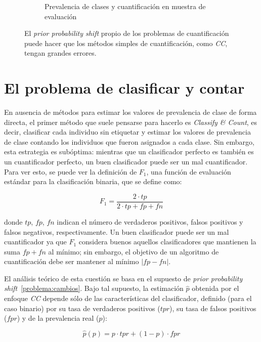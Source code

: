 \begin{figure}[h]
\begin{subfigure}[t]{0.4\textwidth}
        \caption{Prevalencia de clases y cuantificación en muestra de
        evaluación}\label{cambios:cuantificacion_tst}
    \end{subfigure}
    \caption{El {\it prior probability shift\/} propio de los problemas de
    cuantificación puede hacer que los métodos simples de cuantificación, como
    {\it CC}, tengan grandes errores.}
\end{figure}

\section{El problema de clasificar y contar}\label{problema:clasificar_y_contar}

En ausencia de métodos para estimar los valores de prevalencia de clase de forma
directa, el primer método que suele pensarse para hacerlo es {\it Classify \&
Count}, es decir, clasificar cada individuo sin etiquetar y estimar los valores
de prevalencia de clase contando los individuos que fueron asignados a cada
clase. Sin embargo, esta estrategia es subóptima: mientras que un clasificador
perfecto es también es un cuantificador perfecto, un buen clasificador puede ser
un mal cuantificador. Para ver esto, se puede ver la definición de $F_1$, una
función de evaluación estándar para la clasificación binaria, que se define
como:

\begin{equation}
    F_1 = \frac{2 \cdot tp}{2 \cdot tp + fp + fn}
\end{equation}

donde $tp$, $fp$, $fn$ indican el número de verdaderos positivos, falsos
positivos y falsos negativos, respectivamente. Un buen clasificador puede ser un
mal cuantificador ya que $F_1$ considera buenos aquellos clasificadores que
mantienen la suma $fp + fn$ al mínimo; sin embargo, el objetivo de un algoritmo
de cuantificación debe ser mantener al mínimo $|fp-fn|$.

El análisis teórico de esta cuestión se basa en el supuesto de {\it prior
probability shift\/}~\ref{problema:cambios}. Bajo tal supuesto, la estimación
$\hat p$ obtenida por el enfoque {\it CC\/} depende sólo de las características
del clasificador, definido (para el caso binario) por su tasa de verdaderos
positivos ($tpr$), su tasa de falsos positivos ($fpr$) y de la prevalencia real
($p$):

\begin{equation}\label{ecuacion:cc}
    \hat p(p) = p \cdot {tpr} + (1-p) \cdot {fpr}
\end{equation}

